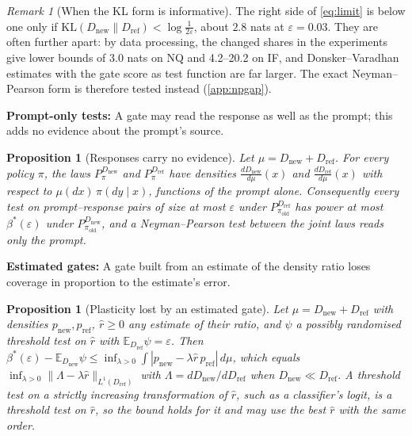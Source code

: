 \documentclass{article}
\theoremstyle{plain}
\newtheorem{proposition}[theorem]{Proposition}
\theoremstyle{definition}
\theoremstyle{remark}
\newtheorem{remark}[theorem]{Remark}
\newcommand{\E}{\mathbb{E}}
\newcommand{\KL}{\mathrm{KL}}
\newcommand{\Dref}{D_{\mathrm{ref}}}
\newcommand{\Dnew}{D_{\mathrm{new}}}
\newcommand{\pold}{\pi_{\mathrm{old}}}
\begin{document}
\begin{remark}[When the KL form is informative]
\label{rem:klvacuous}
The right side of \cref{eq:limit} is below one only if $\KL(\Dnew\|\Dref)<\log\frac{1}{2\varepsilon}$, about $2.8$
nats at $\varepsilon=0.03$. They are often further apart: by data processing, the changed shares in the experiments give lower bounds of 3.0
nats on NQ and 4.2--20.2 on IF, and Donsker--Varadhan estimates \citep{donsker1983asymptotic} with the gate score as
test function are far larger. The exact Neyman--Pearson form is therefore tested instead (\cref{app:npgap}).
\end{remark}

\textbf{Prompt-only tests:} A gate may read the response as well as the prompt; this adds no evidence about the prompt's source.

\begin{proposition}[Responses carry no evidence]
\label{prop:noevidence}
Let $\mu=\Dnew+\Dref$. For every policy $\pi$, the laws $P^{\Dnew}_{\pi}$ and $P^{\Dref}_{\pi}$ have densities
$\tfrac{d\Dnew}{d\mu}(x)$ and $\tfrac{d\Dref}{d\mu}(x)$ with respect to $\mu(dx)\,\pi(dy\mid x)$, functions of the
prompt alone. Consequently every test on prompt--response pairs of size at most $\varepsilon$ under $P^{\Dref}_{\pold}$
has power at most $\beta^\ast(\varepsilon)$ under $P^{\Dnew}_{\pold}$, and a Neyman--Pearson test between the joint
laws reads only the prompt.
\end{proposition}

\textbf{Estimated gates:} A gate built from an estimate of the density ratio loses coverage in proportion to the estimate's error.

\begin{proposition}[Plasticity lost by an estimated gate]
\label{prop:estimated}
Let $\mu=\Dnew+\Dref$ with densities $p_{\mathrm{new}},p_{\mathrm{ref}}$, $\hat r\ge0$ any estimate of their
ratio, and $\psi$ a possibly randomised threshold test on $\hat r$ with $\E_{\Dref}\psi=\varepsilon$. Then
$\beta^\ast(\varepsilon)-\E_{\Dnew}\psi\le\inf_{\lambda>0}\int|p_{\mathrm{new}}-\lambda\hat r\,p_{\mathrm{ref}}|\,d\mu$,
which equals $\inf_{\lambda>0}\|\Lambda-\lambda\hat r\|_{L^1(\Dref)}$ with $\Lambda=d\Dnew/d\Dref$ when
$\Dnew\ll\Dref$. A threshold test on a strictly increasing transformation of $\hat r$, such as a classifier's logit, is a
threshold test on $\hat r$, so the bound holds for it and may use the best $\hat r$ with the same order.
\end{proposition}
\end{document}
